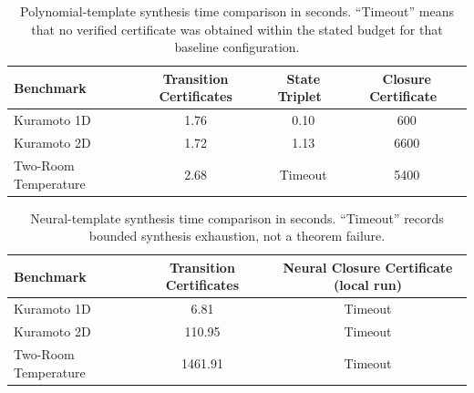 \begin{table}[t]
\centering
\caption{Polynomial-template synthesis time comparison in seconds. ``Timeout'' means that no verified certificate was obtained within the stated budget for that baseline configuration.}
\label{tab:results-poly}
\begin{tabular}{lccc}
\hline
\textbf{Benchmark} & \textbf{Transition Certificates} & \textbf{State Triplet~\cite{wongpiromsarn2015automata}} & \textbf{Closure Certificate~\cite{murali2024closure}} \\
\hline
Kuramoto 1D & 1.76 & 0.10 & 600 \\
Kuramoto 2D & 1.72 & 1.13 & 6600 \\
Two-Room Temperature & 2.68 & Timeout & 5400 \\
\hline
\end{tabular}
\end{table}
\begin{table}[t]
\centering
\caption{Neural-template synthesis time comparison in seconds. ``Timeout'' records bounded synthesis exhaustion, not a theorem failure.}
\label{tab:results-neural}
\begin{tabular}{lcc}
\hline
\textbf{Benchmark} & \textbf{Transition Certificates} & \textbf{Neural Closure Certificate (local run)} \\
\hline
Kuramoto 1D & 6.81 & Timeout \\
Kuramoto 2D & 110.95 & Timeout \\
Two-Room Temperature & 1461.91 & Timeout \\
\hline
\end{tabular}
\end{table}
